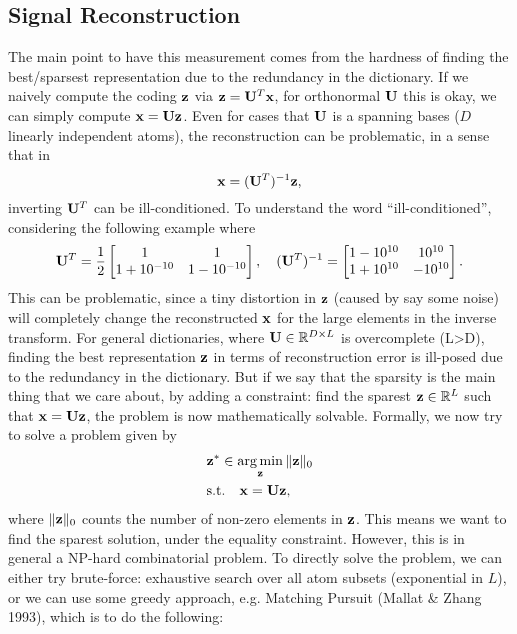 \documentclass[../main.tex]{subfiles}
\begin{document}
\subsection{Signal Reconstruction}
The main point to have this measurement comes from the hardness of finding the best/sparsest representation due to the redundancy in the dictionary. If we naively compute the coding ${\bf z}$ via ${\bf z} = {\bf U}^T{\bf x}$, 
for orthonormal ${\bf U}$ this is okay, we can simply compute ${\bf x}={\bf Uz}$. Even for cases that ${\bf U}$ is a spanning bases ($D$ linearly independent atoms), the reconstruction can be problematic, in a sense that in
\begin{equation*}
{\bf x} = ({\bf U}^T)^{-1}{\bf z},
\end{equation*}
inverting ${\bf U}^T$ can be ill-conditioned. To understand the word ``ill-conditioned'', considering the following example where
\begin{equation*}
{\bf U}^T=\frac{1}{2}\begin{bmatrix}
1&1\\
1+10^{-10}&1-10^{-10}
\end{bmatrix}
,\quad ({\bf U}^T)^{-1}=\begin{bmatrix}
1-10^{10}&10^{10}\\
1+10^{10}&-10^{10}
\end{bmatrix}.
\end{equation*}
This can be problematic, since a tiny distortion in ${\bf z}$ (caused by say some noise) will completely change the reconstructed ${\bf x}$ for the large elements in the inverse transform. For general dictionaries, where ${\bf U}\in\mathbb{R}^{D\times L}$ is overcomplete (L>D), finding the best representation ${\bf z}$ in terms of reconstruction error is ill-posed due to the redundancy in the dictionary. But if we say that the sparsity is the main thing that we care about, by adding a constraint: find the sparest ${\bf z}\in \mathbb{R}^L$ such that ${\bf x}={\bf Uz}$, the problem is now mathematically solvable. Formally, we now try to solve a problem given by
\begin{align}
\label{eq_9_L0}&{\bf z}^*\in\mathop{\arg\min}_{\bf z}\|{\bf z}\|_0\\
&{\rm s.t.}\quad {\bf x}={\bf Uz},\notag
\end{align}
where $\|{\bf z}\|_0$ counts the number of non-zero elements in ${\bf z}$. This means we want to find the sparest solution, under the equality constraint. However, this is in general a NP-hard combinatorial problem. To directly solve the problem, we can either try brute-force: exhaustive search over all atom subsets (exponential in $L$), or we can use some greedy approach, e.g. Matching Pursuit (Mallat \& Zhang 1993), which is to do the following:
\end{document}
